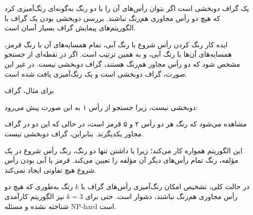 یک گراف دوبخشی است اگر بتوان رأس‌های آن را با دو رنگ
به‌گونه‌ای رنگ‌آمیزی کرد که هیچ دو رأس مجاوری
هم‌رنگ نباشند.
بررسی دوبخشی بودن یک گراف با الگوریتم‌های پیمایش گراف
بسیار آسان است.

ایده کار رنگ کردن رأس شروع با رنگ آبی،
تمام همسایه‌های آن با رنگ قرمز، همسایه‌های آن‌ها با رنگ آبی، و به همین ترتیب است.
اگر در نقطه‌ای از جستجو مشخص شود که
دو رأس مجاور هم‌رنگ هستند،
گراف دوبخشی نیست.
در غیر این صورت، گراف دوبخشی است و یک رنگ‌آمیزی
یافت شده است.

برای مثال، گراف
\begin{center}
\end{center}
دوبخشی نیست، زیرا جستجو از رأس ۱
به این صورت پیش می‌رود:
\begin{center}
\end{center}
مشاهده می‌شود که رنگ هر دو رأس ۲ و ۵
قرمز است، در حالی که این دو در گراف مجاور یکدیگرند.
بنابراین، گراف دوبخشی نیست.

این الگوریتم همواره کار می‌کند؛ زیرا با داشتن تنها دو رنگ،
رنگ رأس شروع در یک مؤلفه،
رنگ تمام رأس‌های دیگر آن مؤلفه را تعیین می‌کند.
قرمز یا آبی بودن رأس شروع
هیچ تفاوتی ایجاد نمی‌کند.

در حالت کلی،
تشخیص امکان رنگ‌آمیزی رأس‌های گراف با $k$ رنگ
به‌طوری که هیچ دو رأس مجاوری هم‌رنگ نباشند، دشوار است.
حتی برای $k=3$ نیز الگوریتم کارآمدی شناخته نشده
و مسئله NP-hard است.